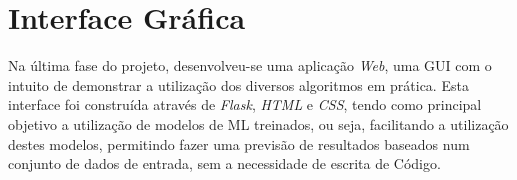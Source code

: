 \documentclass[12pt,a4paper,twoside]{report}
\begin{document}
{


\chapter{Interface Gráfica}

Na última fase do projeto, desenvolveu-se uma aplicação \emph{Web}, uma \gls{GUI} com o intuito de demonstrar a utilização dos diversos algoritmos em prática. Esta interface foi construída através de \textit{Flask}, \textit{HTML} e \textit{CSS}, tendo como principal objetivo a utilização de modelos de \gls{ML} treinados, ou seja, facilitando a utilização destes modelos, permitindo fazer uma previsão de resultados baseados num conjunto de dados de entrada, sem a necessidade de escrita de Código.

}
\end{document}
